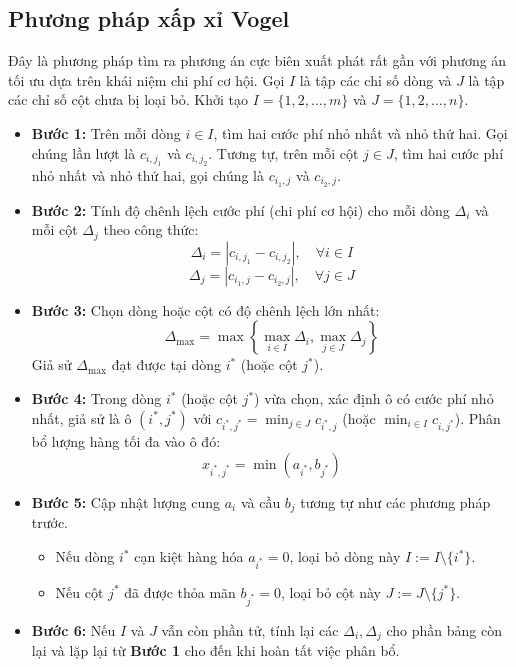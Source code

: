 \documentclass[../main.tex]{subfiles}
\begin{document}
\subsection{Phương pháp xấp xỉ Vogel}
Đây là phương pháp tìm ra phương án cực biên xuất phát rất gần với phương án tối ưu dựa trên khái niệm chi phí cơ hội. Gọi $I$ là tập các chỉ số dòng và $J$ là tập các chỉ số cột chưa bị loại bỏ. Khởi tạo $I = \{1, 2, \dots, m\}$ và $J = \{1, 2, \dots, n\}$.
\begin{itemize}
    \item \textbf{Bước 1:} Trên mỗi dòng $i \in I$, tìm hai cước phí nhỏ nhất và nhỏ thứ hai. Gọi chúng lần lượt là $c_{i, j_1}$ và $c_{i, j_2}$. Tương tự, trên mỗi cột $j \in J$, tìm hai cước phí nhỏ nhất và nhỏ thứ hai, gọi chúng là $c_{i_1, j}$ và $c_{i_2, j}$.
    \item \textbf{Bước 2:} Tính độ chênh lệch cước phí (chi phí cơ hội) cho mỗi dòng $\Delta_i$ và mỗi cột $\Delta_j$ theo công thức:
    \[ \Delta_i = |c_{i, j_1} - c_{i, j_2}|, \quad \forall i \in I \]
    \[ \Delta_j = |c_{i_1, j} - c_{i_2, j}|, \quad \forall j \in J \]
    \item \textbf{Bước 3:} Chọn dòng hoặc cột có độ chênh lệch lớn nhất:
    \[ \Delta_{\max} = \max \left\{ \max_{i \in I} \Delta_i, \max_{j \in J} \Delta_j \right\} \]
    Giả sử $\Delta_{\max}$ đạt được tại dòng $i^*$ (hoặc cột $j^*$).
    \item \textbf{Bước 4:} Trong dòng $i^*$ (hoặc cột $j^*$) vừa chọn, xác định ô có cước phí nhỏ nhất, giả sử là ô $(i^*, j^*)$ với $c_{i^*, j^*} = \min_{j \in J} c_{i^*, j}$ (hoặc $\min_{i \in I} c_{i, j^*}$). Phân bổ lượng hàng tối đa vào ô đó: 
    \[ x_{i^*, j^*} = \min(a_{i^*}, b_{j^*}) \]
    \item \textbf{Bước 5:} Cập nhật lượng cung $a_i$ và cầu $b_j$ tương tự như các phương pháp trước.
    \begin{itemize}
        \item Nếu dòng $i^*$ cạn kiệt hàng hóa $a_{i^*} = 0$, loại bỏ dòng này $I := I \setminus \{i^*\}$.

        \item Nếu cột $j^*$ đã được thỏa mãn $b_{j^*} = 0$, loại bỏ cột này $J := J \setminus \{j^*\}$.
    \end{itemize}

    \item \textbf{Bước 6:} Nếu $I$ và $J$ vẫn còn phần tử, tính lại các $\Delta_i, \Delta_j$ cho phần bảng còn lại và lặp lại từ \textbf{Bước 1} cho đến khi hoàn tất việc phân bổ.
\end{itemize}
\end{document}
